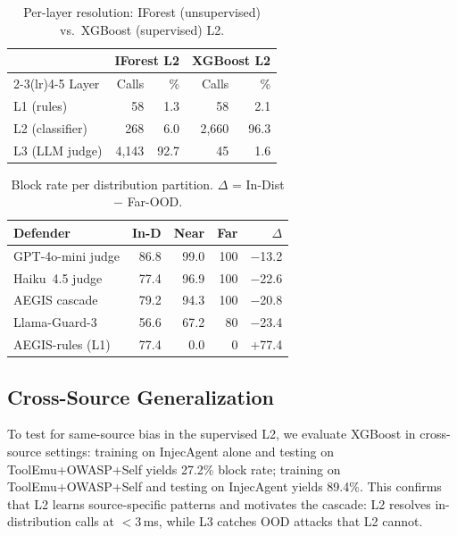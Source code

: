\documentclass[sigconf,anonymous]{acmart}
\begin{document}
\begin{table}[t]
\centering\small
\caption{Per-layer resolution: IForest (unsupervised) vs.\ XGBoost (supervised) L2.}
\vspace{-0.1in}
\label{tab:perlayer}
\begin{tabular}{lrrrr}
\toprule
 & \multicolumn{2}{c}{IForest L2} & \multicolumn{2}{c}{XGBoost L2} \\
\cmidrule(lr){2-3}\cmidrule(lr){4-5}
Layer & Calls & \% & Calls & \% \\
\midrule
L1 (rules) & 58 & 1.3 & 58 & 2.1 \\
L2 (classifier) & 268 & 6.0 & 2{,}660 & 96.3 \\
L3 (LLM judge) & 4{,}143 & 92.7 & 45 & 1.6 \\
\bottomrule
\end{tabular}
\vspace{-0.1in}
\end{table}

\begin{table}[t]
\centering\small
\caption{Block rate per distribution partition. $\Delta$ = In-Dist $-$ Far-OOD.}
\vspace{-0.1in}
\label{tab:perdist}
\begin{tabular}{lrrrr}
\toprule
Defender & In-D & Near & Far & $\Delta$ \\
\midrule
GPT-4o-mini judge & 86.8 & 99.0 & 100 & $-$13.2 \\
Haiku~4.5 judge & 77.4 & 96.9 & 100 & $-$22.6 \\
AEGIS cascade & 79.2 & 94.3 & 100 & $-$20.8 \\
Llama-Guard-3 & 56.6 & 67.2 & 80 & $-$23.4 \\
AEGIS-rules (L1) & 77.4 & 0.0 & 0 & +77.4 \\
\bottomrule
\end{tabular}
\vspace{-0.1in}
\end{table}

\subsection{Cross-Source Generalization}

To test for same-source bias in the supervised L2, we evaluate XGBoost in cross-source settings: training on InjecAgent alone and testing on ToolEmu+OWASP+Self yields 27.2\% block rate; training on ToolEmu+OWASP+Self and testing on InjecAgent yields 89.4\%. This confirms that L2 learns source-specific patterns and motivates the cascade: L2 resolves in-distribution calls at $<$3\,ms, while L3 catches OOD attacks that L2 cannot.
\end{document}
